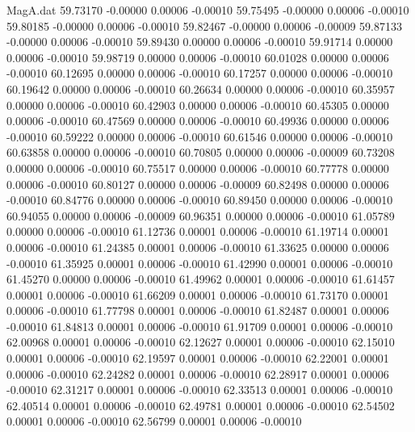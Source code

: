 \begin{filecontents}{MagA.dat}
  59.73170   -0.00000    0.00006   -0.00010
  59.75495   -0.00000    0.00006   -0.00010
  59.80185   -0.00000    0.00006   -0.00010
  59.82467   -0.00000    0.00006   -0.00009
  59.87133   -0.00000    0.00006   -0.00010
  59.89430    0.00000    0.00006   -0.00010
  59.91714    0.00000    0.00006   -0.00010
  59.98719    0.00000    0.00006   -0.00010
  60.01028    0.00000    0.00006   -0.00010
  60.12695    0.00000    0.00006   -0.00010
  60.17257    0.00000    0.00006   -0.00010
  60.19642    0.00000    0.00006   -0.00010
  60.26634    0.00000    0.00006   -0.00010
  60.35957    0.00000    0.00006   -0.00010
  60.42903    0.00000    0.00006   -0.00010
  60.45305    0.00000    0.00006   -0.00010
  60.47569    0.00000    0.00006   -0.00010
  60.49936    0.00000    0.00006   -0.00010
  60.59222    0.00000    0.00006   -0.00010
  60.61546    0.00000    0.00006   -0.00010
  60.63858    0.00000    0.00006   -0.00010
  60.70805    0.00000    0.00006   -0.00009
  60.73208    0.00000    0.00006   -0.00010
  60.75517    0.00000    0.00006   -0.00010
  60.77778    0.00000    0.00006   -0.00010
  60.80127    0.00000    0.00006   -0.00009
  60.82498    0.00000    0.00006   -0.00010
  60.84776    0.00000    0.00006   -0.00010
  60.89450    0.00000    0.00006   -0.00010
  60.94055    0.00000    0.00006   -0.00009
  60.96351    0.00000    0.00006   -0.00010
  61.05789    0.00000    0.00006   -0.00010
  61.12736    0.00001    0.00006   -0.00010
  61.19714    0.00001    0.00006   -0.00010
  61.24385    0.00001    0.00006   -0.00010
  61.33625    0.00000    0.00006   -0.00010
  61.35925    0.00001    0.00006   -0.00010
  61.42990    0.00001    0.00006   -0.00010
  61.45270    0.00000    0.00006   -0.00010
  61.49962    0.00001    0.00006   -0.00010
  61.61457    0.00001    0.00006   -0.00010
  61.66209    0.00001    0.00006   -0.00010
  61.73170    0.00001    0.00006   -0.00010
  61.77798    0.00001    0.00006   -0.00010
  61.82487    0.00001    0.00006   -0.00010
  61.84813    0.00001    0.00006   -0.00010
  61.91709    0.00001    0.00006   -0.00010
  62.00968    0.00001    0.00006   -0.00010
  62.12627    0.00001    0.00006   -0.00010
  62.15010    0.00001    0.00006   -0.00010
  62.19597    0.00001    0.00006   -0.00010
  62.22001    0.00001    0.00006   -0.00010
  62.24282    0.00001    0.00006   -0.00010
  62.28917    0.00001    0.00006   -0.00010
  62.31217    0.00001    0.00006   -0.00010
  62.33513    0.00001    0.00006   -0.00010
  62.40514    0.00001    0.00006   -0.00010
  62.49781    0.00001    0.00006   -0.00010
  62.54502    0.00001    0.00006   -0.00010
  62.56799    0.00001    0.00006   -0.00010

\end{filecontents}
